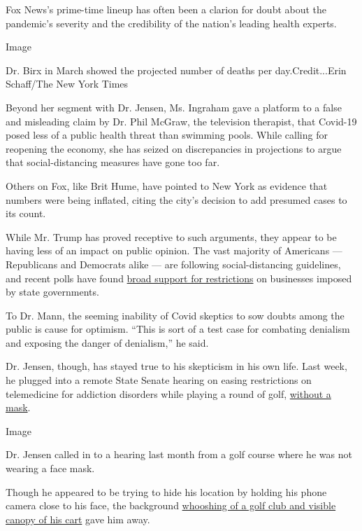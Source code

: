 Fox News's prime-time lineup has often been a clarion for doubt about
the pandemic's severity and the credibility of the nation's leading
health experts.

Image

Dr. Birx in March showed the projected number of deaths per
day.Credit...Erin Schaff/The New York Times

Beyond her segment with Dr. Jensen, Ms. Ingraham gave a platform to a
false and misleading claim by Dr. Phil McGraw, the television therapist,
that Covid-19 posed less of a public health threat than swimming pools.
While calling for reopening the economy, she has seized on discrepancies
in projections to argue that social-distancing measures have gone too
far.

Others on Fox, like Brit Hume, have pointed to New York as evidence that
numbers were being inflated, citing the city's decision to add presumed
cases to its count.

While Mr. Trump has proved receptive to such arguments, they appear to
be having less of an impact on public opinion. The vast majority of
Americans --- Republicans and Democrats alike --- are following
social-distancing guidelines, and recent polls have found
\href{https://www.washingtonpost.com/politics/americans-support-state-restrictions-on-businesses-and-halt-to-immigration-during-virus-outbreak-post-u-md-poll-finds/2020/04/27/763249ee-88af-11ea-9dfd-990f9dcc71fc_story.html?utm_campaign=wp_the_daily_202\&utm_medium=email\&utm_source=newsletter\&wpisrc=nl_daily202}{broad
support for restrictions} on businesses imposed by state governments.

To Dr. Mann, the seeming inability of Covid skeptics to sow doubts among
the public is cause for optimism. ``This is sort of a test case for
combating denialism and exposing the danger of denialism,'' he said.

Dr. Jensen, though, has stayed true to his skepticism in his own life.
Last week, he plugged into a remote State Senate hearing on easing
restrictions on telemedicine for addiction disorders while playing a
round of golf,
\href{https://www.startribune.com/gop-state-senator-in-spotlight-for-golfing-during-zoom-hearing/570133912/}{without
a mask}.

Image

Dr. Jensen called in to a hearing last month from a golf course where he
was not wearing a face mask.

Though he appeared to be trying to hide his location by holding his
phone camera close to his face, the background
\href{https://www.youtube.com/watch?v=Lmgc1MIuHUA}{whooshing of a golf
club and visible canopy of his cart} gave him away.

